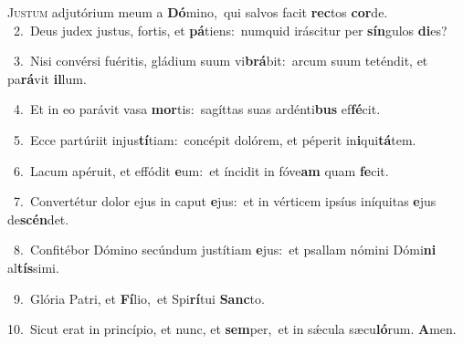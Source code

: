 \lettrine{\initial\textcolor{\initialcolor}{J}}{ustum} adjutórium meum a \textbf{Dó}\-mino,~\star qui salvos facit \textbf{rec}\-tos \textbf{cor}\-de.\\
{\numbfont\textcolor{\numbcolor}{~2.}}~Deus judex justus, fortis, et \textbf{pá}\-tiens:~\star numquid iráscitur per \textbf{sín}\-gulos \textbf{di}\-es?\par
{\numbfont\textcolor{\numbcolor}{~3.}}~Nisi convérsi fuéritis, gládium suum vi\-\textbf{brá}\-bit:~\star arcum suum teténdit, et pa\-\textbf{rá}\-vit \textbf{il}\-lum.\par
{\numbfont\textcolor{\numbcolor}{~4.}}~Et in eo parávit vasa \textbf{mor}\-tis:~\star sagíttas suas ardénti\textbf{bus} ef\-\textbf{fé}\-cit.\par
{\numbfont\textcolor{\numbcolor}{~5.}}~Ecce partúriit injus\-\textbf{tí}\-tiam:~\star concépit dolórem, et péperit in\-\textbf{i}\-qui\-\textbf{tá}\-tem.\par
{\numbfont\textcolor{\numbcolor}{~6.}}~Lacum apéruit, et effódit \textbf{e}\-um:~\star et íncidit in fóve\textbf{am} quam \textbf{fe}\-cit.\par
{\numbfont\textcolor{\numbcolor}{~7.}}~Convertétur dolor ejus in caput \textbf{e}\-jus:~\star et in vérticem ipsíus iníquitas \textbf{e}\-jus de\-\textbf{scén}\-det.\par
{\numbfont\textcolor{\numbcolor}{~8.}}~Confitébor Dómino secúndum justítiam \textbf{e}\-jus:~\star et psallam nómini Dómi\textbf{ni} al\-\textbf{tís}\-simi.\par
{\numbfont\textcolor{\numbcolor}{~9.}}~Glória Patri, et \textbf{Fí}\-lio,~\star et Spi\-\textbf{rí}\-tui \textbf{Sanc}\-to.\par
{\numbfont\textcolor{\numbcolor}{10.}}~Sicut erat in princípio, et nunc, et \textbf{sem}\-per,~\star et in sǽcula sæcu\-\textbf{ló}\-rum. \textbf{A}\-men.\par

